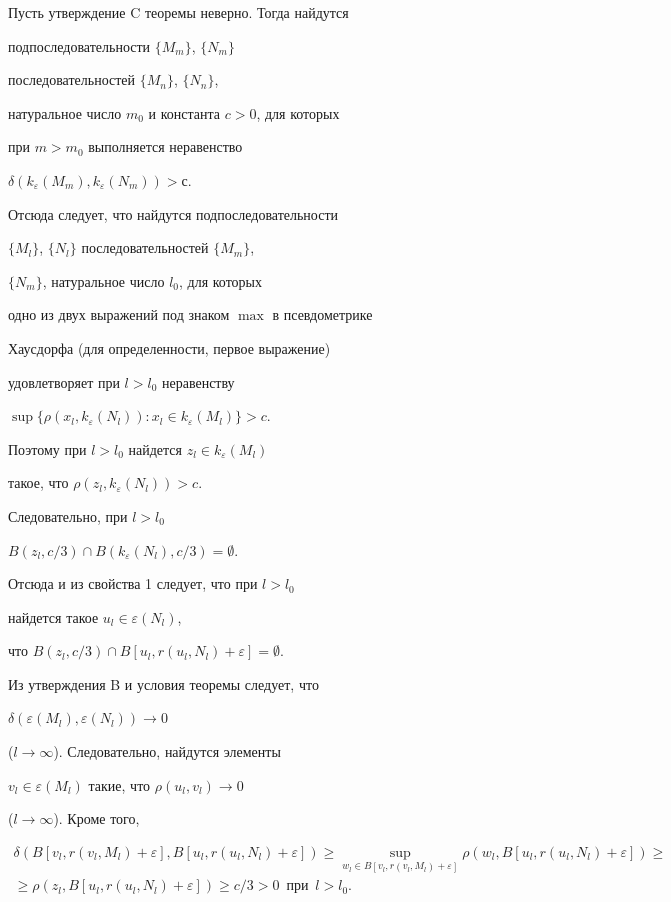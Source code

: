 Пусть утверждение C теоремы неверно. Тогда найдутся 


подпоследовательности $\{M_{m}\}$, $\{N_{m}\}$


последовательностей $\{M_{n}\}$, $\{N_{n}\}$,


натуральное число $m_{0}$ и константа $c > 0$, для которых 


при $m > m_{0}$ выполняется неравенство


$\delta (k_{\varepsilon }(M_{m}),k_{\varepsilon }(N_{m})) > с$.


Отсюда следует, что найдутся подпоследовательности


$\{M_{l}\}$, $\{N_{l}\}$ последовательностей $\{M_{m}\}$, 


$\{N_{m}\}$, натуральное число $l_{0}$, для которых


одно из двух выражений под знаком $\max$ в псевдометрике


Хаусдорфа (для определенности, первое выражение)


удовлетворяет при $l > l_{0}$ неравенству


$\sup\{\rho(x_{l},k_{\varepsilon }(N_{l})) :


x_{l} \in k_{\varepsilon }(M_{l})\} > c$.


Поэтому при $l > l_{0}$ найдется  $z_{l} \in k_{\varepsilon }(M_{l})$


такое, что $\rho(z_{l},k_{\varepsilon }(N_{l})) > c$.


Следовательно, при $l > l_{0}$\;


$B(z_{l},c/3) \cap B(k_{\varepsilon }(N_{l}),c/3) = \emptyset$.


Отсюда и из свойства 1 следует, что при $l > l_{0}$


найдется такое $u_{l} \in \varepsilon (N_{l})$,


что $B(z_{l},c/3) \cap B[u_{l},r(u_{l},N_{l}) + \varepsilon ] = \emptyset$.


Из утверждения B и условия теоремы следует, что 


$\delta (\varepsilon (M_{l}),\varepsilon (N_{l})) \to 0$ 


($l \to \infty $). Следовательно, найдутся элементы 


$v_{l} \in \varepsilon (M_{l})$ такие, что $\rho (u_{l},v_{l}) \to 0$


($l \to \infty $). Кроме того,


\begin{multline}


\delta (B[v_{l},r(v_{l},M_{l}) +


\varepsilon ],B[u_{l},r(u_{l},N_{l}) + \varepsilon ]) 


\geq \sup\limits_{w_{l} \in B[v_{l},r(v_{l},M_{l}) + \varepsilon]}


{\rho(w_{l},B[u_{l},r(u_{l},N_{l}) + \varepsilon])} \geq \\ 


%


\ge \rho(z_{l},B[u_{l},r(u_{l},N_{l})+\varepsilon]) \geq c/3 >0


\ \; \text{при}\ \; l > l_{0}. 


\end{multline}



